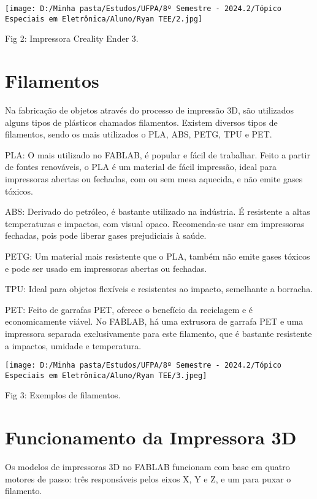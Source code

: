 \documentclass[
]{book}
\begin{document}
\texttt{[image: D:/Minha pasta/Estudos/UFPA/8º Semestre - 2024.2/Tópico Especiais em Eletrônica/Aluno/Ryan TEE/2.jpg]}

Fig 2: Impressora Creality Ender 3.

\section{Filamentos}\label{filamentos}

Na fabricação de objetos através do processo de impressão 3D, são utilizados alguns tipos de plásticos chamados filamentos. Existem diversos tipos de filamentos, sendo os mais utilizados o PLA, ABS, PETG, TPU e PET.

PLA: O mais utilizado no FABLAB, é popular e fácil de trabalhar. Feito a partir de fontes renováveis, o PLA é um material de fácil impressão, ideal para impressoras abertas ou fechadas, com ou sem mesa aquecida, e não emite gases tóxicos.

ABS: Derivado do petróleo, é bastante utilizado na indústria. É resistente a altas temperaturas e impactos, com visual opaco. Recomenda-se usar em impressoras fechadas, pois pode liberar gases prejudiciais à saúde.

PETG: Um material mais resistente que o PLA, também não emite gases tóxicos e pode ser usado em impressoras abertas ou fechadas.

TPU: Ideal para objetos flexíveis e resistentes ao impacto, semelhante a borracha.

PET: Feito de garrafas PET, oferece o benefício da reciclagem e é economicamente viável. No FABLAB, há uma extrusora de garrafa PET e uma impressora separada exclusivamente para este filamento, que é bastante resistente a impactos, umidade e temperatura.

\texttt{[image: D:/Minha pasta/Estudos/UFPA/8º Semestre - 2024.2/Tópico Especiais em Eletrônica/Aluno/Ryan TEE/3.jpeg]}

Fig 3: Exemplos de filamentos.

\section{Funcionamento da Impressora 3D}\label{funcionamento-da-impressora-3d}

Os modelos de impressoras 3D no FABLAB funcionam com base em quatro motores de passo: três responsáveis pelos eixos X, Y e Z, e um para puxar o filamento.
\end{document}
